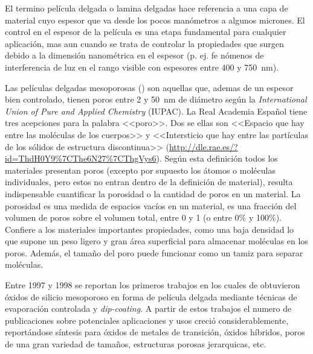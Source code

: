 
	El termino película delgada o lamina delgadas hace referencia a una capa de material cuyo espesor que va desde los pocos manómetros a algunos micrones. El control en el espesor de la película es una etapa fundamental para cualquier aplicación, mas aun cuando se trata de controlar la propiedades que surgen debido a la dimensión nanométrica en el espesor (p. ej. fe nómenos de interferencia de luz en el rango visible con espesores entre 400 y \SI{750}{\nm}). 

	Las películas delgadas mesoporosas (\pdm) son aquellas que, ademas de un espesor bien controlado, tienen poros entre 2 y \SI{50}{\nm} de diámetro según la  \textit{International Union of Pure and Applied Chemistry} (IUPAC)\cite{iupac-1994}. La Real Academia Español tiene tres acepciones para la palabra <<poro>>. Dos se ellas son <<Espacio que hay entre las moléculas de los cuerpos>> y <<Intersticio que hay entre las partículas de los sólidos de estructura discontinua>> (\url{http://dle.rae.es/?id=ThdH0Y9%7CThe6N27%7CThgVys6}). Según esta definición todos los materiales presentan poros (excepto por supuesto los átomos o moléculas individuales, pero estos no entran dentro de la definición de material), resulta indispensable cuantificar la porosidad\index{porosidad} o la cantidad de poros en un material. La porosidad\index{porosidad} es una medida de espacios vacíos en un material, es una fracción del volumen de poros sobre el volumen total, entre 0 y 1 (o entre 0\% y 100\%).\cite{iupac-1994} Confiere a los materiales importantes propiedades, como una baja densidad lo que supone un peso ligero y gran área superficial para almacenar moléculas en los poros. Además, el tamaño del poro\index{poro} puede funcionar como un tamiz para separar moléculas.\cite{Martin2004} 


	Entre 1997 y 1998 se reportan los primeros trabajos en los cuales de obtuvieron óxidos de silicio mesoporoso en forma de película delgada mediante técnicas de evaporación controlada y \textit{dip-coating}.\cite{Lu1997,Zhao1998a,Zhao1998,Brinker1999} A partir de estos trabajos el numero de publicaciones sobre potenciales aplicaciones y usos creció considerablemente, reportándose síntesis para óxidos de metales de transición\cite{Ciesla1996,Ulagappan1996,Antonelli1995}, óxidos híbridos, poros de una gran variedad de tamaños, estructuras porosas jerarquicas, etc.\cite{Soler-Illia2006,Moller1998}

